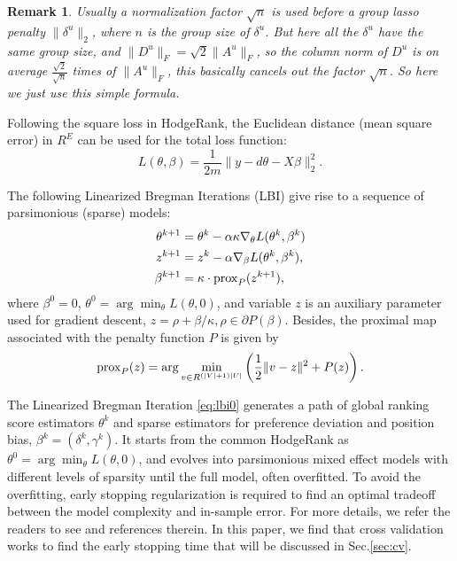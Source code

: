 \documentclass[10pt,journal,cspaper,compsoc]{IEEEtran}
\def\prox{{\rm prox}}
\newtheorem{remark}{Remark}
\begin{document}
{\begin{remark}
Usually a normalization factor $\sqrt{n}$ is used before a group lasso penalty $\|\delta^u\|_2$, where $n$ is the group size of $\delta^u$. But here all the $\delta^u$ have the same group size, and $\|D^u\|_F = \sqrt{2}\|A^u\|_F$, so the column norm of $D^u$ is on average $\frac{\sqrt{2}}{\sqrt{n}}$ times of $\|A^u\|_F$, this basically cancels out the factor $\sqrt{n}$. So here we just use this simple formula.
\end{remark}

Following the square loss in HodgeRank, the Euclidean distance (mean square error) in $R^{E}$ can be used for the total loss function:
\begin{equation}\label{eq-loss}
L(\theta,\beta) = \frac{1}{2m}\|y - d\theta - X\beta\|_2^2.
\end{equation}

The following Linearized Bregman Iterations (LBI) give rise to a sequence of parsimonious (sparse) models:
\begin{subequations}\label{eq:lbi0}
\begin{align}
\theta^{k+1} & = \theta^k - \alpha \kappa  \nabla_\theta L(\theta^k,\beta^k) \label{eq:lbi0-a}\\
z^{k+1} & = z^k - \alpha \nabla_\beta L(\theta^k,\beta^k), \label{eq:lbi0-b}\\
 \beta^{k+1} &=\kappa \cdot {\prox}_{P}(z^{k+1}), \label{eq:lbi0-c}
\end{align}
\end{subequations}
where $\beta^0 = 0$, $\theta^0 = \arg \min_{\theta} L(\theta,0)$, and variable $z$ is an auxiliary parameter used for gradient descent, $z = \rho+\beta/\kappa, \rho \in \partial P(\beta)$. Besides,
the proximal map associated with the penalty function $P$ is given by
\[ \prox_P(z) = \arg\min_{v \in R^{(|V|+1)|U|}} \left( \frac{1}{2}\| v - z\|^2 + P(z) \right ). \]

The Linearized Bregman Iteration \eqref{eq:lbi0} generates a path of global ranking score estimators $\theta^k$ and sparse estimators for preference deviation and position bias, $\beta^k=(\delta^k,\gamma^k)$. It starts from the common HodgeRank as $\theta^0 = \arg \min_{\theta} L(\theta,0)$, and evolves into parsimonious mixed effect models with different levels of sparsity until the full model, often overfitted. To avoid the overfitting, early stopping regularization is required to find an optimal tradeoff between the model complexity and in-sample error. For more details, we refer the readers to see \cite{osher2014} and references therein. In this paper, we find that cross validation works to find the early stopping time that will be discussed in Sec.\ref{sec:cv}.

}
\end{document}
